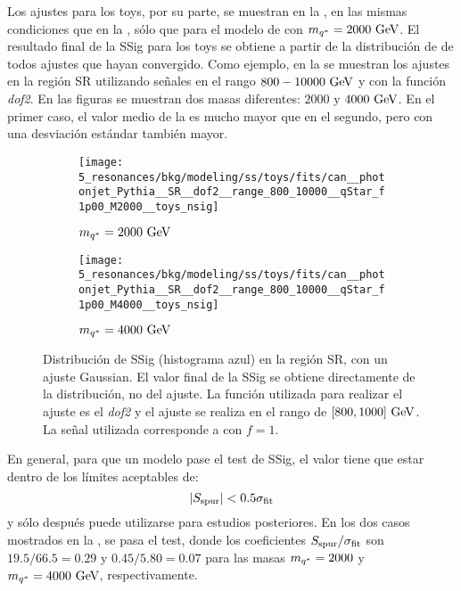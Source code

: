 Los ajustes para los toys, por su parte, se muestran en la \Fig{\ref{fig:bkg:modeling:sigbkg:sstest:sstest_toys_examples}}, en las mismas condiciones que en la \Fig{\ref{fig:bkg:modeling:sigbkg:sstest:sstest_asimov_examples}}, sólo que para el modelo de \qstar con \(m_{q^*}=2000~\text{GeV}\). El resultado final de la \ac{SSig} para los toys se obtiene a partir de la distribución de \sspur de todos ajustes que hayan convergido. Como ejemplo, en la \Fig{\ref{fig:bkg:modeling:sigbkg:sstest:sstest_toys_distributions}} se muestran los ajustes en la región SR utilizando señales \qstar en el rango \(800-10000~\text{GeV}\) y con la función \textit{dof2}. En las figuras se muestran dos masas \qstar diferentes: \(2000\) y \(4000~\text{GeV}\). En el primer caso, el valor medio de la \sspur es mucho mayor que en el segundo, pero con una desviación estándar también mayor.

\begin{figure}[ht!]
    \centering
    \begin{subfigure}[h]{0.49\linewidth}
        \centering
        \texttt{[image: 5\_resonances/bkg/modeling/ss/toys/fits/can\_\_photonjet\_Pythia\_\_SR\_\_dof2\_\_range\_800\_10000\_\_qStar\_f1p00\_M2000\_\_toys\_nsig]}
        \caption{\(m_{q^*} = 2000~\text{GeV}\)}
    \end{subfigure}
    \hfill
    \begin{subfigure}[h]{0.49\linewidth}
        \centering
        \texttt{[image: 5\_resonances/bkg/modeling/ss/toys/fits/can\_\_photonjet\_Pythia\_\_SR\_\_dof2\_\_range\_800\_10000\_\_qStar\_f1p00\_M4000\_\_toys\_nsig]}
        \caption{\(m_{q^*} = 4000~\text{GeV}\)}
    \end{subfigure}
    \caption{Distribución de \ac{SSig} (histograma azul) en la región SR, con un ajuste Gaussian. El valor final de la \ac{SSig} se obtiene directamente de la distribución, no del ajuste. La función utilizada para realizar el ajuste es el \textit{dof2} y el ajuste se realiza en el rango de \([800, 1000]~\text{GeV}\). La se\~nal utilizada corresponde a \qstar con \(f=1\).}
    \label{fig:bkg:modeling:sigbkg:sstest:sstest_toys_distributions}
\end{figure}


En general, para que un modelo pase el test de \ac{SSig}, el valor \sspur tiene que estar dentro de los límites aceptables de:
\begin{equation}
    \label{eq:bkg:modeling:sigbkg:sstest:condition}
    |S_{\text{spur}}| < 0.5 \sigma_{\text{fit}}
\end{equation}
y sólo después puede utilizarse para estudios posteriores. En los dos casos mostrados en la \Fig{\ref{fig:bkg:modeling:sigbkg:sstest:sstest_toys_distributions}}, se pasa el test, donde los coeficientes \(S_{\text{spur}} / \sigma_{\text{fit}}\) son \(19.5 / 66.5 = 0.29\) y \(0.45 / 5.80 = 0.07\) para las masas \(m_{q^*} = 2000\) y \(m_{q^*} = 4000~\text{GeV}\), respectivamente.

